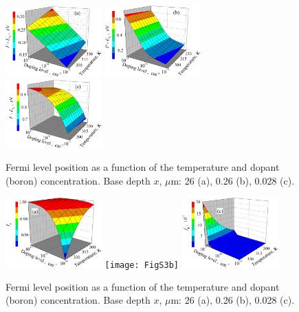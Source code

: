 \documentclass [sort&compress] {elsarticle}
\begin{document}
\begin{figure}
\includegraphics[width=0.33\textwidth]{FigS2a}%
\includegraphics[width=0.33\textwidth]{FigS2b}
\includegraphics[width=0.33\textwidth]{FigS2c}
\caption{\label{figS2}
Fermi level position as a function of the temperature and dopant (boron) concentration.
Base depth $x$, $\mu$m: 26 (a), 0.26 (b), 0.028 (c).
}%
\end{figure}


\begin{figure}
\includegraphics[width=0.33\textwidth]{FigS3a}%
\texttt{[image: FigS3b]}
\includegraphics[width=0.33\textwidth]{FigS3c}
\caption{\label{figS3}
Fermi level position as a function of the temperature and dopant (boron) concentration.
Base depth $x$, $\mu$m: 26 (a), 0.26 (b), 0.028 (c).
}%
\end{figure}
\end{document}

